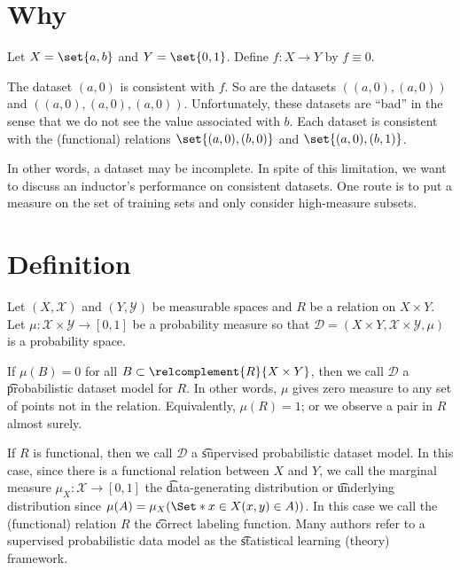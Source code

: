 
\section*{Why}

Let $X = \set{a, b}$ and $Y = \set{0, 1}$. Define $f: X \to Y$ by $f \equiv 0$.

The dataset $(a, 0)$ is consistent with $f$.
So are the datasets $((a, 0), (a, 0))$ and $((a, 0), (a, 0), (a, 0))$.
Unfortunately, these datasets are ``bad'' in the sense that we do not see the value associated with $b$.
Each dataset is consistent with the (functional) relations $\set{(a, 0), (b, 0)}$ and $\set{(a, 0), (b, 1)}$.

In other words, a dataset may be incomplete.
In spite of this limitation, we want to discuss an inductor's performance on consistent datasets.
One route is to put a measure on the set of training sets and only consider high-measure subsets.


\section*{Definition}

Let $(X, \mathcal{X} )$ and $(Y, \mathcal{Y} )$ be measurable spaces and $R$ be a relation on $X \times  Y$.
Let $\mu : \mathcal{X}  \times  \mathcal{Y}  \to [0, 1]$ be a probability measure so that $\mathcal{D}  = (X \times  Y, \mathcal{X}  \times  \mathcal{Y} , \mu )$ is a probability space.

If $\mu (B) = 0$ for all $B \subset \relcomplement{R}{X \times Y}$, then we call $\mathcal{D} $ a \t{probabilistic dataset model} for $R$.
In other words, $\mu $ gives zero measure to any set of points not in the relation.
Equivalently, $\mu (R) = 1$; or we observe a pair in $R$ almost surely.

If $R$ is functional, then we call $\mathcal{D} $ a \t{supervised probabilistic dataset model}.
In this case, since there is a functional relation between $X$ and $Y$, we call the marginal measure $\mu _X: \mathcal{X}  \to [0, 1]$ the \t{data-generating distribution} or \t{underlying distribution} since $\mu (A) = \mu _X(\Set*{x \in X}{(x, y) \in A)})$.
In this case we call the (functional) relation $R$ the \t{correct labeling function}.
Many authors refer to a supervised probabilistic data model as the \t{statistical learning (theory) framework}.

